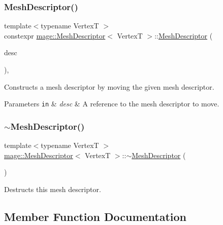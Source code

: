 \subsubsection{\texorpdfstring{Mesh\+Descriptor()}{MeshDescriptor()}\hspace{0.1cm}{\footnotesize\ttfamily [3/3]}}
{\footnotesize\ttfamily template$<$typename VertexT $>$ \\
constexpr \hyperlink{structmage_1_1_mesh_descriptor}{mage\+::\+Mesh\+Descriptor}$<$ VertexT $>$\+::\hyperlink{structmage_1_1_mesh_descriptor}{Mesh\+Descriptor} (\begin{DoxyParamCaption}\item[{\hyperlink{structmage_1_1_mesh_descriptor}{Mesh\+Descriptor}$<$ VertexT $>$ \&\&}]{desc }\end{DoxyParamCaption})\hspace{0.3cm}{\ttfamily [default]}, {\ttfamily [noexcept]}}

Constructs a mesh descriptor by moving the given mesh descriptor.


\begin{DoxyParams}[1]{Parameters}
\mbox{\tt in}  & {\em desc} & A reference to the mesh descriptor to move. \\
\hline
\end{DoxyParams}
\hypertarget{structmage_1_1_mesh_descriptor_adca32db164ab3032164c8dfe17af3db4}{}\label{structmage_1_1_mesh_descriptor_adca32db164ab3032164c8dfe17af3db4} 
\subsubsection{\texorpdfstring{$\sim$\+Mesh\+Descriptor()}{~MeshDescriptor()}}
{\footnotesize\ttfamily template$<$typename VertexT $>$ \\
\hyperlink{structmage_1_1_mesh_descriptor}{mage\+::\+Mesh\+Descriptor}$<$ VertexT $>$\+::$\sim$\hyperlink{structmage_1_1_mesh_descriptor}{Mesh\+Descriptor} (\begin{DoxyParamCaption}{ }\end{DoxyParamCaption})\hspace{0.3cm}{\ttfamily [default]}}

Destructs this mesh descriptor. 

\subsection{Member Function Documentation}
\hypertarget{structmage_1_1_mesh_descriptor_addf1fbbe9f1433ca9697eaf14e5ffa22}{}\label{structmage_1_1_mesh_descriptor_addf1fbbe9f1433ca9697eaf14e5ffa22} 
